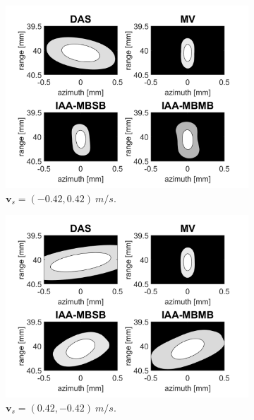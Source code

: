 \begin{figure}[ht]
\begin{subfigure}[t]{0.48\linewidth}
        \includegraphics[width=\linewidth]{./images/results/2.1/motion_-45_-06.png}
        \caption{$\boldsymbol{v}_s = (-0.42, 0.42)~m/s$.}
    \end{subfigure}
    \quad
    \begin{subfigure}[t]{0.48\linewidth}
        \includegraphics[width=\linewidth]{./images/results/2.1/motion_-45_06.png}
        \caption{$\boldsymbol{v}_s = (0.42, -0.42)~m/s$.}
    \end{subfigure}
    \quad
    \begin{subfigure}[t]{0.48\linewidth}

\end{subfigure}
\end{figure}
